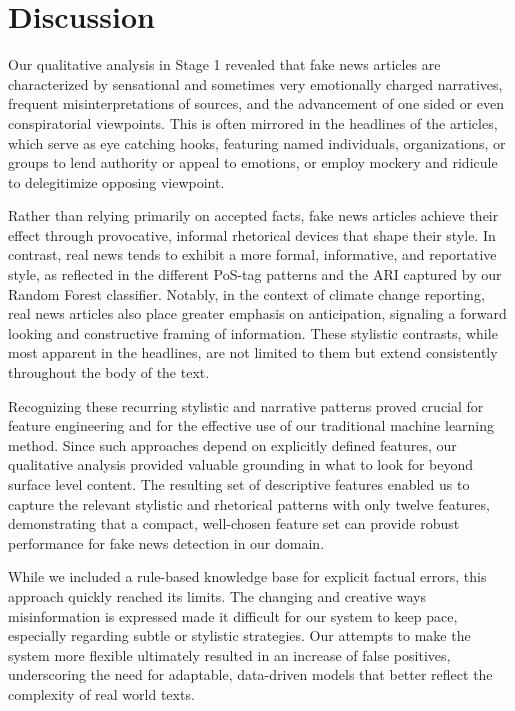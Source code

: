 \documentclass[12pt,a4paper,twocolumn]{article}
\begin{document}
\section{Discussion}
\label{sec:discussion}
Our qualitative analysis in Stage 1 revealed that fake news articles are characterized by sensational and sometimes very emotionally charged narratives, frequent misinterpretations of sources, and the advancement of one sided or even conspiratorial viewpoints. This is often mirrored in the headlines of the articles, which serve as eye catching hooks, featuring named individuals, organizations, or groups to lend authority or appeal to emotions, or employ mockery and ridicule to delegitimize opposing viewpoint.

Rather than relying primarily on accepted facts, fake news articles achieve their effect through provocative, informal rhetorical devices that shape their style. In contrast, real news tends to exhibit a more formal, informative, and reportative style, as reflected in the different PoS-tag patterns and the ARI captured by our Random Forest classifier. Notably, in the context of climate change reporting, real news articles also place greater emphasis on anticipation, signaling a forward looking and constructive framing of information. These stylistic contrasts, while most apparent in the headlines, are not limited to them but extend consistently throughout the body of the text. 

Recognizing these recurring stylistic and narrative patterns proved crucial for feature engineering and for the effective use of our traditional machine learning method. Since such approaches depend on explicitly defined features, our qualitative analysis provided valuable grounding in what to look for beyond surface level content. The resulting set of descriptive features enabled us to capture the relevant stylistic and rhetorical patterns with only twelve features, demonstrating that a compact, well-chosen feature set can provide robust performance for fake news detection in our domain.

While we included a rule-based knowledge base for explicit factual errors, this approach quickly reached its limits. The changing and creative ways misinformation is expressed made it difficult for our system to keep pace, especially regarding subtle or stylistic strategies. Our attempts to make the system more flexible ultimately resulted in an increase of false positives, underscoring the need for adaptable, data-driven models that better reflect the complexity of real world texts.
\end{document}
